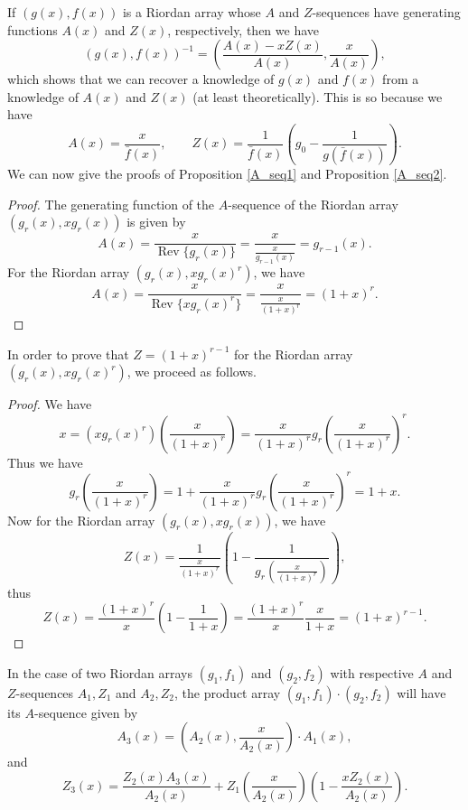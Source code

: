 \documentclass[12pt,reqno]{article}
\theoremstyle{definition}
\DeclareMathOperator{\Rev}{Rev}
\begin{document}
If $(g(x), f(x))$ is a Riordan array whose $A$ and $Z$-sequences have generating functions $A(x)$ and $Z(x)$, respectively, then we have
$$(g(x), f(x))^{-1}=\left(\frac{A(x)-xZ(x)}{A(x)}, \frac{x}{A(x)}\right),$$ which shows that we can recover a knowledge of $g(x)$ and $f(x)$ from a knowledge of $A(x)$ and $Z(x)$ (at least theoretically). This is so because we have
$$A(x)=\frac{x}{\bar{f}(x)},\quad\quad Z(x)=\frac{1}{\bar{f}(x)}\left(g_0-\frac{1}{g(\bar{f}(x))}\right).$$
We can now give the proofs of Proposition \ref{A_seq1} and Proposition \ref{A_seq2}.
\begin{proof} The generating function of the  $A$-sequence of the Riordan array $(g_r(x), xg_r(x))$ is given by
$$A(x)=\frac{x}{\Rev\{g_r(x)\}}=\frac{x}{\frac{x}{g_{r-1}(x)}}=g_{r-1}(x).$$
For the Riordan array $(g_r(x), xg_r(x)^r)$, we have
$$A(x)=\frac{x}{\Rev\{xg_r(x)^r\}}=\frac{x}{\frac{x}{(1+x)^r}}=(1+x)^r.$$
\end{proof}
In order to prove that $Z=(1+x)^{r-1}$ for the Riordan array $(g_r(x), xg_r(x)^r)$, we proceed as follows.
\begin{proof} We have
$$x=(xg_r(x)^r)\left(\frac{x}{(1+x)^r}\right)=\frac{x}{(1+x)^r}g_r\left(\frac{x}{(1+x)^r}\right)^r.$$
Thus we have $$g_r\left(\frac{x}{(1+x)^r}\right)=1+\frac{x}{(1+x)^r}g_r\left(\frac{x}{(1+x)^r}\right)^r=1+x.$$
Now for the Riordan array $(g_r(x), xg_r(x))$, we have
$$Z(x)=\frac{1}{\frac{x}{(1+x)^r}}\left(1-\frac{1}{g_r\left(\frac{x}{(1+x)^r}\right)}\right),$$ thus
$$Z(x)=\frac{(1+x)^r}{x}\left(1-\frac{1}{1+x}\right)=\frac{(1+x)^r}{x} \frac{x}{1+x}=(1+x)^{r-1}.$$
\end{proof}
In the case of two Riordan arrays $(g_1,f_1)$ and $(g_2,f_2)$ with respective $A$ and $Z$-sequences $A_1, Z_1$ and $A_2, Z_2$, the product array $(g_1,f_1)\cdot (g_2,f_2)$ will have its $A$-sequence given by
$$A_3(x)=\left(A_2(x), \frac{x}{A_2(x)}\right)\cdot A_1(x),$$ and
$$Z_3(x)=\frac{Z_2(x)A_3(x)}{A_2(x)}+Z_1\left(\frac{x}{A_2(x)}\right)\left(1-\frac{xZ_2(x)}{A_2(x)}\right).$$
\end{document}
